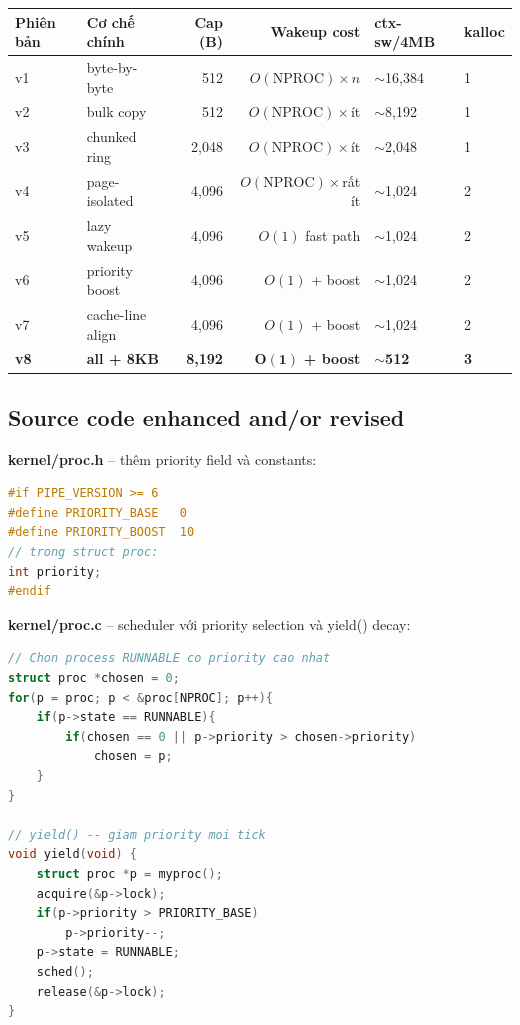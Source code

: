 \documentclass[11pt,a4paper]{article}
\begin{document}
\begin{center}
\begin{tabularx}{\linewidth}{lXrrll}
\toprule
\textbf{Phiên bản} & \textbf{Cơ chế chính} & \textbf{Cap (B)} & \textbf{Wakeup cost} & \textbf{ctx-sw/4MB} & \textbf{kalloc} \\
\midrule
v1 & byte-by-byte       & 512   & $O(\text{NPROC})\times n$ & $\sim$16{,}384 & 1 \\
v2 & bulk copy          & 512   & $O(\text{NPROC})\times$ít & $\sim$8{,}192  & 1 \\
v3 & chunked ring       & 2{,}048 & $O(\text{NPROC})\times$ít & $\sim$2{,}048 & 1 \\
v4 & page-isolated      & 4{,}096 & $O(\text{NPROC})\times$rất ít & $\sim$1{,}024 & 2 \\
v5 & lazy wakeup        & 4{,}096 & $O(1)$ fast path & $\sim$1{,}024 & 2 \\
v6 & priority boost     & 4{,}096 & $O(1)$ + boost   & $\sim$1{,}024 & 2 \\
v7 & cache-line align   & 4{,}096 & $O(1)$ + boost   & $\sim$1{,}024 & 2 \\
\textbf{v8} & \textbf{all + 8KB} & \textbf{8{,}192} & $\mathbf{O(1)}$ \textbf{+ boost} & $\sim$\textbf{512} & \textbf{3} \\
\bottomrule
\end{tabularx}
\end{center}

\subsection{Source code enhanced and/or revised}

\textbf{kernel/proc.h} -- thêm priority field và constants:

\begin{lstlisting}[language=C]
#if PIPE_VERSION >= 6
#define PRIORITY_BASE   0
#define PRIORITY_BOOST  10
// trong struct proc:
int priority;
#endif
\end{lstlisting}

\textbf{kernel/proc.c} -- scheduler với priority selection và yield() decay:

\begin{lstlisting}[language=C]
// Chon process RUNNABLE co priority cao nhat
struct proc *chosen = 0;
for(p = proc; p < &proc[NPROC]; p++){
    if(p->state == RUNNABLE){
        if(chosen == 0 || p->priority > chosen->priority)
            chosen = p;
    }
}

// yield() -- giam priority moi tick
void yield(void) {
    struct proc *p = myproc();
    acquire(&p->lock);
    if(p->priority > PRIORITY_BASE)
        p->priority--;
    p->state = RUNNABLE;
    sched();
    release(&p->lock);
}
\end{lstlisting}
\end{document}
